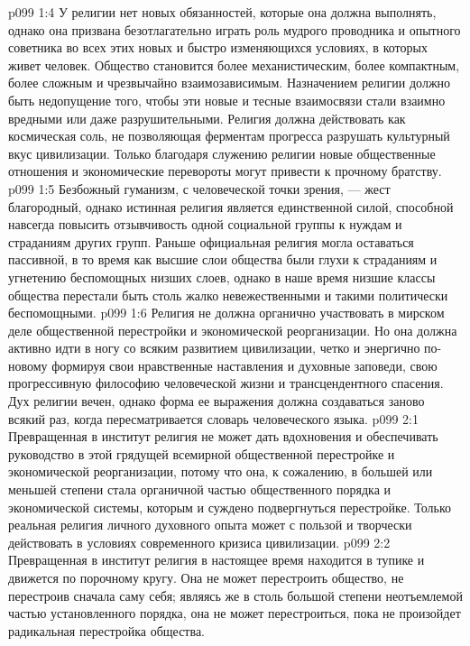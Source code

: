 \vs p099 1:4 У религии нет новых обязанностей, которые она должна выполнять, однако она призвана безотлагательно играть роль мудрого проводника и опытного советника во всех этих новых и быстро изменяющихся условиях, в которых живет человек. Общество становится более механистическим, более компактным, более сложным и чрезвычайно взаимозависимым. Назначением религии должно быть недопущение того, чтобы эти новые и тесные взаимосвязи стали взаимно вредными или даже разрушительными. Религия должна действовать как космическая соль, не позволяющая ферментам прогресса разрушать культурный вкус цивилизации. Только благодаря служению религии новые общественные отношения и экономические перевороты могут привести к прочному братству.
\vs p099 1:5 Безбожный гуманизм, с человеческой точки зрения, --- жест благородный, однако истинная религия является единственной силой, способной навсегда повысить отзывчивость одной социальной группы к нуждам и страданиям других групп. Раньше официальная религия могла оставаться пассивной, в то время как высшие слои общества были глухи к страданиям и угнетению беспомощных низших слоев, однако в наше время низшие классы общества перестали быть столь жалко невежественными и такими политически беспомощными.
\vs p099 1:6 Религия не должна органично участвовать в мирском деле общественной перестройки и экономической реорганизации. Но она должна активно идти в ногу со всяким развитием цивилизации, четко и энергично по\hyp{}новому формируя свои нравственные наставления и духовные заповеди, свою прогрессивную философию человеческой жизни и трансцендентного спасения. Дух религии вечен, однако форма ее выражения должна создаваться заново всякий раз, когда пересматривается словарь человеческого языка.
\vs p099 2:1 Превращенная в институт религия не может дать вдохновения и обеспечивать руководство в этой грядущей всемирной общественной перестройке и экономической реорганизации, потому что она, к сожалению, в большей или меньшей степени стала органичной частью общественного порядка и экономической системы, которым и суждено подвергнуться перестройке. Только реальная религия личного духовного опыта может с пользой и творчески действовать в условиях современного кризиса цивилизации.
\vs p099 2:2 Превращенная в институт религия в настоящее время находится в тупике и движется по порочному кругу. Она не может перестроить общество, не перестроив сначала саму себя; являясь же в столь большой степени неотъемлемой частью установленного порядка, она не может перестроиться, пока не произойдет радикальная перестройка общества.
